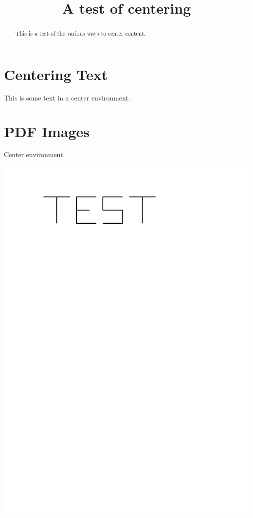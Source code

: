\documentclass{ximera}
\title{A test of centering}
\begin{document}
\begin{abstract}
This is a test of the various ways to center content.
\end{abstract}
\maketitle

\section{Centering Text}

\begin{center}
This is some text in a center environment.
\end{center}



\section{PDF Images}

Center environment: 

\begin{center}
\includegraphics{TestImagePDF}
\end{center}
\end{document}
